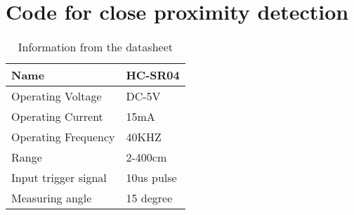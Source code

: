 \section{Code for close proximity detection}


\begin{table}[H]
\centering
\begin{tabular}{|l|l|}
\hline
\textbf{Name}        & \textbf{HC-SR04} \\ \hline
Operating Voltage    & DC-5V                              \\ \hline
Operating Current    & 15mA                               \\ \hline
Operating Frequency  & 40KHZ                              \\ \hline
Range                & 2-400cm                            \\ \hline
Input trigger signal & 10us pulse                         \\ \hline
Measuring angle      & 15 degree                          \\ \hline
\end{tabular}
\caption{Information from the datasheet\cite{hcsr40datesheet}}
\end{table}

%